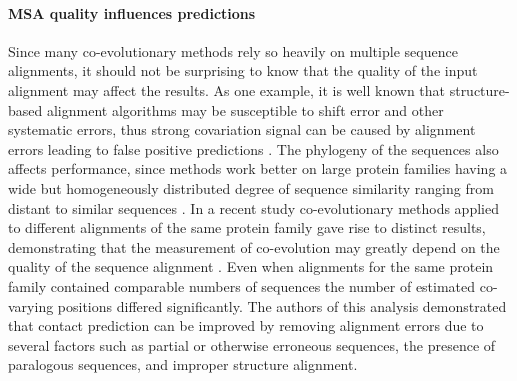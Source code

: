 \paragraph{MSA quality influences predictions}
Since many co-evolutionary methods rely so heavily on multiple sequence alignments, it should not be surprising to know that the quality of the input alignment may affect the results.
As one example, it is well known that structure-based alignment algorithms may be susceptible to shift error and other systematic errors, thus strong covariation signal can be caused by alignment errors leading to false positive predictions \cite{dickson2010identifying}.
The phylogeny of the sequences also affects performance, since methods work better on large protein families having a wide but homogeneously distributed degree of sequence similarity ranging from distant to similar sequences \cite{de2013emerging}.
In a recent study co-evolutionary methods applied to different alignments of the same protein family gave rise to distinct results, demonstrating that the measurement of co-evolution may greatly depend on the quality of the sequence alignment \cite{dickson2010identifying}.
Even when alignments for the same protein family contained comparable numbers of sequences the number of estimated co-varying positions differed significantly.
The authors of this analysis demonstrated that contact prediction can be improved by removing alignment errors due to several factors such as partial or otherwise erroneous sequences, the presence of paralogous sequences, and improper structure alignment.

